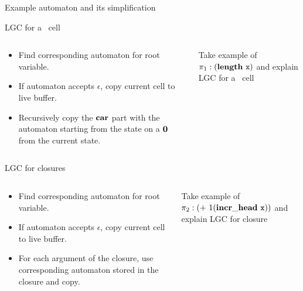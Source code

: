 \documentclass[xcolor=x11names,compress,mathserif]{beamer}
\renewcommand{\(}{\begin{columns}}
\renewcommand{\)}{\end{columns}}
\newcommand{\<}[1]{\begin{column}{#1}}
\renewcommand{\>}{\end{column}}
\begin{document}
\begin{frame}{Example automaton and its simplification}

\end{frame}
\begin{frame}{LGC for a \CONS\ cell}
  \begin{columns}[c]
    \begin{column}{0.45\textwidth}
      \begin{itemize}
      \item Find corresponding automaton for root variable.
      \item If automaton accepts $\epsilon$, copy current cell to live buffer.
      \item Recursively copy the $\mbox{$\mathbf{car}$}$ part with the automaton starting from the state on a $\mathbf{0}$ from the current state.
      \end{itemize}
    \end{column}
    \begin{column}{0.50\textwidth}
      Take example of $\pi_1:(\plength\ \px)$ and explain
      LGC for a \CONS\  cell
    \end{column}
  \end{columns}
\end{frame}

\begin{frame}{LGC for closures}
   \begin{columns}[c]
    \begin{column}{0.45\textwidth}
      \begin{itemize}
      \item Find corresponding automaton for root variable.
      \item If automaton accepts $\epsilon$, copy current cell to live buffer.
      \item For each argument of the closure, use corresponding automaton stored in the closure and copy.
      \end{itemize}
    \end{column}
    \begin{column}{0.50\textwidth}
      Take example of $\pi_2:(+\ 1 (\pfun\ \px))$ and explain
      LGC for closure
    \end{column}
   \end{columns}
\end{frame}
\end{document}
